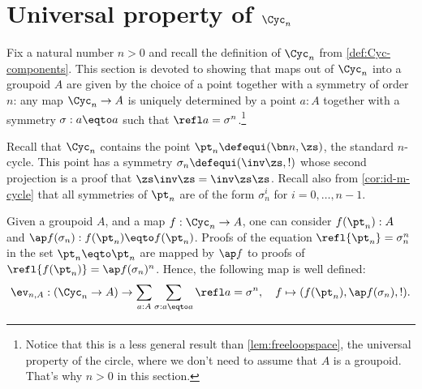 \section{Universal property of $\Cyc_n$}
\label{sec:universal-property-cyc-n}

Fix a natural number $n>0$ and recall the definition of $\Cyc_n$
from \cref{def:Cyc-components}.
This section is devoted to showing that maps out of $\Cyc_n$ into a groupoid $A$
are given by the choice of a point together with a symmetry of
order $n$: any map $\Cyc_n \to A$ is uniquely determined by a point $a:A$ together with a symmetry $\sigma:a\eqto a$ such that
$\refl a =\sigma^n$.\footnote{Notice that this is a less general result than \cref{lem:freeloopspace}, the universal property of the circle, where we don't need to assume that $A$ is a groupoid. That's why $n>0$ in this section.}

Recall that $\Cyc_n$ contains the point $\pt_n \defequi (\bn n, \zs)$,
\ie the standard $n$-cycle. This
point has a symmetry $\sigma_n \defequi (\inv\zs, !)$ whose second 
projection is a proof that $\zs\inv\zs = \inv\zs\zs$.
%
Recall also from \cref{cor:id-m-cycle} that all symmetries of 
$\pt_n$ are of the form $\sigma_n^i$ for $i=0,\dots,n-1$.

Given a groupoid $A$, and a map $f :
\Cyc_n \to A$, one can consider $f(\pt_n):A$ and 
$\ap f (\sigma_n): f(\pt_n) \eqto f(\pt_n)$. 
Proofs of the equation $\refl{\pt_n} = \sigma_n^n$ in the
set $\pt_n \eqto \pt_n$ are mapped by $\ap f$ to proofs of 
$\refl{f(\pt_n)} = \ap f(\sigma_n)^n$. 
Hence, the following map is well defined:
\begin{displaymath}
  \ev_{n,A} : (\Cyc_n \to A) \to 
          \sum_{a:A}\sum_{\sigma:a\eqto a}\refl a = \sigma^n,\quad
  f \mapsto (f(\pt_n), \ap f (\sigma_n), !).
\end{displaymath}

